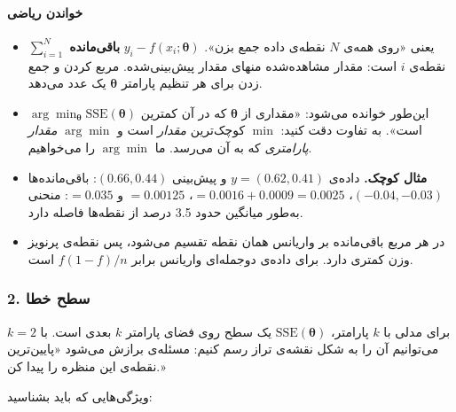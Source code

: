\paragraph{خواندن ریاضی}

\begin{itemize}
\tightlist
\item
  \(\sum_{i=1}^{N}\) یعنی «روی همه‌ی \(N\) نقطه‌ی داده جمع بزن».
  \(y_i - f(x_i;\boldsymbol\theta)\) \textbf{باقی‌مانده }
  نقطه‌ی \(i\) است: مقدار مشاهده‌شده منهای مقدار پیش‌بینی‌شده. مربع کردن و
  جمع زدن برای هر تنظیم پارامتر \(\boldsymbol\theta\) یک عدد می‌دهد.
\item
  \(\arg\min_{\boldsymbol\theta} \mathrm{SSE}(\boldsymbol\theta)\)
  این‌طور خوانده می‌شود: «مقداری از \(\boldsymbol\theta\) که در آن
   کمترین است». به تفاوت دقت کنید: \(\min\) کوچک‌ترین \emph{مقدار
  } است و \(\arg\min\) \emph{مقدار پارامتری} که به آن می‌رسد. ما
  \(\arg\min\) را می‌خواهیم.
\item
  \textbf{مثال کوچک.} داده‌ی \(y = (0.62, 0.41)\) و پیش‌بینی
  \((0.66, 0.44)\): باقی‌مانده‌ها \((-0.04, -0.03)\)، 
  \(= 0.0016 + 0.0009 = 0.0025\)،  \(= 0.00125\) و 
  \(= 0.035\): منحنی به‌طور میانگین حدود 3.5 درصد از نقطه‌ها فاصله دارد.
\item
  در  هر مربع باقی‌مانده بر واریانس همان نقطه تقسیم می‌شود، پس
  نقطه‌ی پرنویز وزن کمتری دارد. برای داده‌ی دوجمله‌ای واریانس برابر
  \(f(1-f)/n\) است.
\end{itemize}

\subsubsection{\texorpdfstring{2. سطح خطا }{2. سطح خطا (error surface)}}

برای مدلی با \(k\) پارامتر، \(\mathrm{SSE}(\boldsymbol\theta)\) یک سطح
روی فضای پارامتر \(k\) بعدی است. با \(k = 2\) می‌توانیم آن را به شکل
نقشه‌ی تراز  رسم کنیم: مسئله‌ی برازش می‌شود «پایین‌ترین
نقطه‌ی این منظره را پیدا کن.»

ویژگی‌هایی که باید بشناسید:

